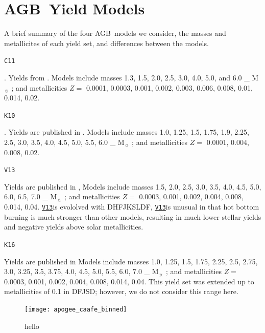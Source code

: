 \documentclass[fleqn,usenatbib]{mnras}
\newcommand{\vxiii}{\texttt{\hyperlink{V13}{V13}}}
\newcommand{\agb}{AGB}
\newcommand{\Mo}{%
    \ifmmode {\rm M}_{\sun}%
    \else M$_{\sun}$
    \fi}
\begin{document}
\section{\agb\ Yield Models} \label{sec:oob_models}
A brief summary of the four \agb\ models we consider, the masses and metallicites of each yield set, and differences between the models.

\hypertarget{C11}{\texttt{C11}}. 
Yields from \citet{cristallo+11,cristallo+15}. 
Models include masses 1.3, 1.5, 2.0, 2.5, 3.0, 4.0, 5.0, and 6.0 \Mo; and 
metallicities $Z = $ 0.0001, 0.0003, 0.001, 0.002, 0.003, 0.006, 0.008, 0.01, 0.014, 0.02. 

\hypertarget{K10}{\texttt{K10}}.
Yields are published in \citet{karakas10}. 
Models include masses  1.0, 1.25, 1.5, 1.75, 1.9, 2.25, 2.5, 3.0, 3.5, 4.0, 4.5, 5.0, 5.5, 6.0 \Mo;
and metallicities $Z=$ 0.0001, 0.004, 0.008, 0.02. 

\hypertarget{V13}{\texttt{V13}} 
Yields are published in \citet{ventura+13,ventura+14,ventura+18,vincenzo+21}, 
Models include masses 1.5, 2.0, 2.5, 3.0, 3.5, 4.0, 4.5, 5.0, 6.0, 6.5, 7.0 \Mo; 
and metallicities $Z=$ 0.0003, 0.001, 0.002, 0.004, 0.008, 0.014, 0.04.
\vxiii is evololved with DHFJKSLDF,
\vxiii is unusual in that hot bottom burning is much stronger than other models, resulting in much lower stellar yields and negative yields above solar metallicities.


\hypertarget{K16}{\texttt{K16}} 
Yields are published in \citet{KL16,karakas+18}
Models include masses 1.0, 1.25, 1.5, 1.75, 2.25, 2.5, 2.75, 3.0, 3.25, 3.5, 3.75, 4.0, 4.5, 5.0, 5.5, 6.0, 7.0 \Mo; 
and metallicities $Z=$ 0.0003, 0.001, 0.002, 0.004, 0.008, 0.014, 0.04.
This yield set was extended up to metallicities of 0.1 in DFJSD; however, we do not consider this range here.


\begin{figure}
    \centering
    \texttt{[image: apogee\_caafe\_binned]}
    \caption{hello}
    \label{fig:caafe_binned}
\end{figure}


\bsp	%
\label{lastpage}
\end{document}
